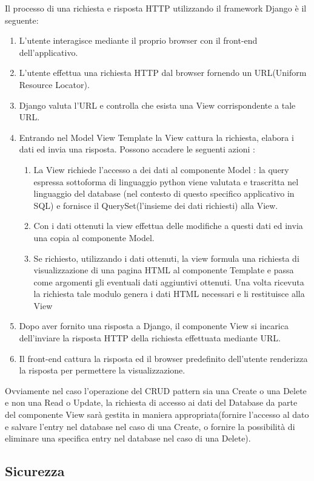 Il processo di una richiesta e risposta HTTP utilizzando il framework Django è il seguente:
\begin{enumerate}
    \item L'utente interagisce mediante il proprio browser con il front-end dell'applicativo.
    \item L'utente effettua una richiesta HTTP dal browser fornendo un URL(Uniform Resource Locator). 
    \item Django valuta l'URL e controlla che esista una View corrispondente a tale URL. 
    \item Entrando nel Model View Template la View cattura la richiesta, elabora i dati ed invia una risposta. Possono accadere le seguenti azioni :
    \begin{enumerate}
        \item La View richiede l'accesso a dei dati al componente Model : la query espressa sottoforma di linguaggio python viene valutata e trascritta nel linguaggio del database (nel contesto di questo specifico applicativo in SQL) e fornisce il QuerySet(l'insieme dei dati richiesti) alla View.
        \item Con i dati ottenuti la view effettua delle modifiche a questi dati ed invia una copia al componente Model. 
        \item Se richiesto, utilizzando i dati ottenuti, la view formula una richiesta di visualizzazione di una pagina HTML al componente Template e passa come argomenti gli eventuali dati aggiuntivi ottenuti. Una volta ricevuta la richiesta tale modulo genera i dati HTML necessari e li restituisce alla View
    \end{enumerate}
    \item Dopo aver fornito una risposta a Django, il componente View si incarica dell'inviare la risposta HTTP della richiesta effettuata mediante URL.
    \item Il front-end cattura la risposta ed il browser predefinito dell'utente renderizza la risposta per permettere la visualizzazione.
\end{enumerate}

Ovviamente nel caso l'operazione del CRUD pattern sia una Create o una Delete e non una Read o Update, la richiesta di accesso ai dati del Database da parte del componente View sarà gestita in maniera appropriata(fornire l'accesso al dato e salvare l'entry nel database nel caso di una Create, o fornire la possibilità di eliminare una specifica entry nel database nel caso di una Delete).
\subsection{Sicurezza}

